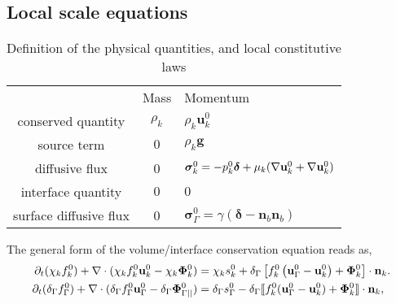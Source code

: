 \subsection{Local scale equations}

\begin{table}[h!]  
    \centering
    \begin{tabular}{ccl}
     & Mass & Momentum \\
    conserved quantity & $\rho_k$ & $\rho_k \textbf{u}_k^0$ \\
    source term  & $0$ & $\rho_k \textbf{g}$ \\
    diffusive flux & 0 & $\bm\sigma_k^0 = -p_k^0 \bm\delta + \mu_k (\mathbf{\nabla} \textbf{u}_k^0 + \mathbf{\nabla} \textbf{u}_k^0)$ \\
    interface quantity & $0$ & $0$ \\
    surface diffusive flux & 0 & $\bm\sigma_\Gamma^0 = \gamma (\bm\delta - \textbf{n}_b\textbf{n}_b)$ \\
    \end{tabular}
    \caption{Definition of the physical quantities, and local constitutive laws}
    \label{tab:qte_Newtonian}
\end{table}
The general form of the volume/interface conservation equation reads as, 
\begin{align}
    \pddt (\chi_k f_k^0)
    + \div (
        \chi_k f_k^0 \textbf{u}_k^0
        - \chi_k \mathbf{\Phi}_k^0 
        )
    &= 
    \chi_k s_k^0
    + \delta_\Gamma \left[
        f_k^0
        \left(
            \textbf{u}_\Gamma^0
            - \textbf{u}_k^0
        \right)
        + \mathbf{\Phi}_k^0
    \right]
    \cdot \textbf{n}_k.
    \label{eq:dt_chi_k_f_k}\\
    \pddt (\delta_\Gamma f_\Gamma^0)  
    + \div (
        \delta_\Gamma  f_\Gamma^0 \textbf{u}_\Gamma^0
        - \delta_\Gamma  \mathbf{\Phi}_{\Gamma||}^0 
        )
    &= 
    \delta_\Gamma s_\Gamma^0
    - \delta_\Gamma \Jump{
    f_k^0 (\textbf{u}_\Gamma^0 - \textbf{u}_k^0)
    + \mathbf{\Phi}_k^0},
    \label{eq:dt_delta_I_f_I}
\end{align}


